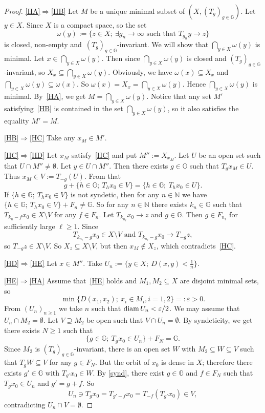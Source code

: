 \documentclass[leqno,a4paper,12pt]{article}
\theoremstyle{definition}
\newcommand{\N}{{\mathbb{N}}}
\newcommand{\G}{\mathbb{G}}
\newcommand{\vep}{\varepsilon}
\begin{document}
\begin{proof}
\eqref{HA}$\Rightarrow$\eqref{HB} Let $M$ be a unique minimal subset of $(X,(T_g)_{g\in\G})$. Let $y\in X$. Since $X$ is a compact space, so the set \[\omega(y):=\{z\in X; \ \exists g_n\to\infty\text{ such that }T_{g_n}y\to z\}\] is closed, non-empty and~$(T_g)_{g\in\G}$-invariant. We will show that $\bigcap_{y\in X}\omega(y)$ is minimal. Let $x\in\bigcap_{y\in X}\omega(y)$. Then since $\bigcap_{y\in X}\omega(y)$ is closed and $(T_g)_{g\in\G}$-invariant, so $X_x\subseteq\bigcap_{y\in X}\omega(y)$. Obviously, we have $\omega(x)\subseteq X_x$ and $\bigcap_{y\in X}\omega(y)\subseteq\omega(x)$. So $\omega(x)=X_x=\bigcap_{y\in X}\omega(y)$. Hence $\bigcap_{y\in X}\omega(y)$ is minimal. By~\eqref{HA}, we get $M=\bigcap_{y\in X}\omega(y)$. Notice that any set $M'$ satisfying~\eqref{HB} is contained in the set $\bigcap_{y\in X}\omega(y)$, so it also satisfies the equality $M'=M$.

\eqref{HB}$\Rightarrow$\eqref{HC} Take any $x_M\in M'$.

\eqref{HC}$\Rightarrow$\eqref{HD} Let $x_M$ satisfy~\eqref{HC} and put $M'':=X_{x_M}$. Let $U$ be an open set such that $U\cap M''\neq\emptyset$. Let $y\in U\cap M''$. Then there exists $g\in\G$ such that $T_gx_M\in U$. Thus $x_M\in V:=T_{-g}(U)$. From that \[g+\{h\in\G;\ T_hx_0\in V\}= \{h\in\G;\ T_hx_0 \in U\}.\]
If $\{h\in\G ;\ T_hx_0\in V\}$ is not syndetic, then for any $n\in\N$ we have $\{h\in\G ;\ T_hx_0\in V\}+F_n\neq\G$. So for any $n\in\N$ there exists $k_n\in\G$ such that $T_{k_n-f}x_0\in X\setminus V$ for any $f\in F_n$. Let $T_{k_{n_{\ell}}}x_0\to z$ and $g\in\G$. Then $g\in F_{{n_\ell}}$ for sufficiently large $\ell\geq1$. Since \[T_{k_{n_\ell}-g}x_0\in X\setminus V\text{ and }T_{k_{n_\ell}-g}x_0\to T_{-g}z,\] so $T_{-g}z\in X\setminus V$. So $X_z\subseteq X\setminus V$, but then $x_M\not\in X_z$, which contradicts~\eqref{HC}.

\eqref{HD}$\Rightarrow$\eqref{HE} Let $x\in M''$. Take $U_n:=\{y\in X;\ D(x,y)<\frac{1}{n}\}$.

\eqref{HE}$\Rightarrow$\eqref{HA} Assume that~\eqref{HE} holds and $M_1,M_2\subseteq X$ are disjoint minimal sets, so \[\min\{D(x_1,x_2);\ x_i\in M_i, i=1,2\}=:\vep>0.\] From $(U_n)_{n\geq1}$ we take $n$ such that ${\rm diam}\,U_n<\vep/2$. We may assume that $U_n\cap M_2=\emptyset$. Let $V\supseteq M_2$ be open such that $V\cap U_n=\emptyset$. By syndeticity, we get there exists $N\geq1$ such that \begin{equation}\label{synd}
\{g\in\G;\ T_gx_0\in U_n\}+F_N=\G.
\end{equation} Since $M_2$ is $(T_g)_{g\in\G}$-invariant, there is an open set $W$ with $M_2\subseteq W\subseteq V$ such that $T_gW\subseteq V$ for any $g\in F_N$. But the orbit of $x_0$ is dense in $X$; therefore there exists $g'\in\G$ with $T_{g'}x_0\in W$. By \eqref{synd}, there exist $g\in\G$ and $f\in F_N$ such that $T_gx_0\in U_n$ and $g'=g+f$. So \[
U_n\ni T_gx_0=T_{g'-f}x_0=T_{-f}(T_{g'}x_0)\in V,\]
contradicting $U_n\cap V=\emptyset$.


\end{proof}
\end{document}
